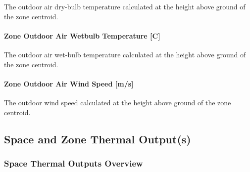 The outdoor air dry-bulb temperature calculated at the height above ground of the zone centroid.

\paragraph{Zone Outdoor Air Wetbulb Temperature {[}C{]}}\label{zone-outdoor-air-wetbulb-temperature-c-000}

The outdoor air wet-bulb temperature calculated at the height above ground of the zone centroid.

\paragraph{Zone Outdoor Air Wind Speed {[}m/s{]}}\label{zone-outdoor-air-wind-speed-ms-000}

The outdoor wind speed calculated at the height above ground of the zone centroid.

\subsection{Space and Zone Thermal Output(s)}\label{Space-thermal-outputs}

\subsubsection{Space Thermal Outputs Overview}

